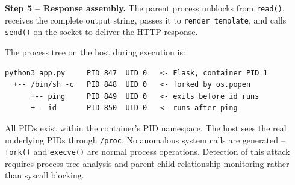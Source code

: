 \textbf{Step 5 -- Response assembly.} The parent process unblocks from \texttt{read()}, receives the complete output string, passes it to \texttt{render\_template}, and calls \texttt{send()} on the socket to deliver the HTTP response.

The process tree on the host during execution is:

\begin{lstlisting}
python3 app.py     PID 847  UID 0   <- Flask, container PID 1
  +-- /bin/sh -c   PID 848  UID 0   <- forked by os.popen
      +-- ping     PID 849  UID 0   <- exits before id runs
      +-- id       PID 850  UID 0   <- runs after ping
\end{lstlisting}

All PIDs exist within the container's PID namespace. The host sees the real underlying PIDs through \texttt{/proc}. No anomalous system calls are generated -- \texttt{fork()} and \texttt{execve()} are normal process operations. Detection of this attack requires process tree analysis and parent-child relationship monitoring rather than syscall blocking.

\vspace{0.5cm}